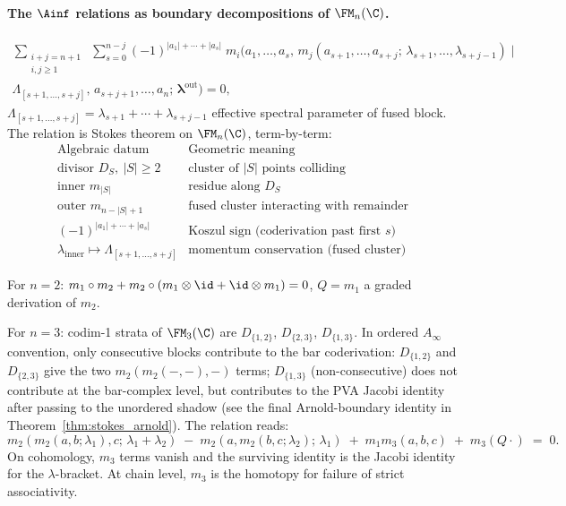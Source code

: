 \paragraph{The $\Ainf$ relations as boundary decompositions of
$\FM_n(\C)$.}
\begin{multline}
\label{eq:intro-ainfty}
\sum_{\substack{i+j = n+1 \\ i,j \geq 1}} \;\sum_{s=0}^{n-j}
(-1)^{|a_1| + \cdots + |a_s|}\;
m_i\bigl(a_1, \ldots, a_s,\,
m_j(a_{s+1}, \ldots, a_{s+j};\, \lambda_{s+1}, \ldots,
\lambda_{s+j-1}) \;\big|\;\\
\Lambda_{[s+1,\ldots,s+j]},\,
a_{s+j+1}, \ldots, a_n;\, \bm\lambda^{\mathrm{out}}\bigr) = 0,
\end{multline}
$\Lambda_{[s+1,\ldots,s+j]} = \lambda_{s+1} + \cdots +
\lambda_{s+j-1}$ effective spectral parameter of fused block.
The relation is Stokes theorem on $\FM_n(\C)$, term-by-term:
\[
\begin{array}{l|l}
\text{Algebraic datum} & \text{Geometric meaning} \\
\hline
\text{divisor } D_S,\ |S|\ge 2 &
 \text{cluster of } |S| \text{ points colliding} \\
\text{inner } m_{|S|} & \text{residue along } D_S \\
\text{outer } m_{n-|S|+1} &
 \text{fused cluster interacting with remainder} \\
(-1)^{|a_1|+\cdots+|a_s|} &
 \text{Koszul sign (coderivation past first } s\text{)} \\
\lambda_{\mathrm{inner}} \mapsto
 \Lambda_{[s+1,\ldots,s+j]} &
 \text{momentum conservation (fused cluster)}
\end{array}
\]

For $n = 2$: $m_1 \circ m_2 + m_2 \circ
(m_1 \otimes \id + \id \otimes m_1) = 0$, $Q = m_1$ a graded
derivation of $m_2$.

For $n = 3$: codim-1 strata of $\FM_3(\C)$ are $D_{\{1,2\}}$,
$D_{\{2,3\}}$, $D_{\{1,3\}}$. In ordered $A_\infty$ convention,
only consecutive blocks contribute to the bar coderivation:
$D_{\{1,2\}}$ and $D_{\{2,3\}}$ give the two
$m_2(m_2(-,-),-)$ terms; $D_{\{1,3\}}$ (non-consecutive) does
not contribute at the bar-complex level, but contributes to the
PVA Jacobi identity after passing to the unordered shadow
(see the final Arnold-boundary identity in
Theorem~\ref{thm:stokes_arnold}). The relation
reads:
\begin{equation}
\label{eq:intro-n3}
m_2(m_2(a,b;\lambda_1), c;\, \lambda_1 + \lambda_2) \;-\;
m_2(a, m_2(b,c;\lambda_2);\, \lambda_1) \;+\;
m_1 m_3(a,b,c) \;+\; m_3(Q\cdot) \;=\; 0.
\end{equation}
On cohomology, $m_3$ terms vanish and the surviving identity is
the Jacobi identity for the $\lambda$-bracket. At chain level,
$m_3$ is the homotopy for failure of strict associativity.

